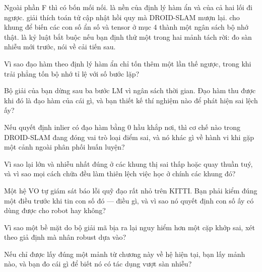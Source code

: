 \documentclass[../../deep_learning.tex]{subfiles}
\begin{document}
Ngoài phần F thì có bốn mối nối.  là nền của định lý hàm ẩn và của cả hai lối đi ngược.  giải thích toán tử cập nhật hồi quy mà DROID-SLAM mượn lại.  cho khung để biến các con số ẩn số và tensor ở mục 4 thành một ngân sách bộ nhớ thật.  là kỷ luật bắt buộc nếu bạn định thử một trong hai mảnh tách rời: đo sàn nhiễu mới trước, nói về cải tiến sau.

\begin{tukiem}
\item Vì sao đạo hàm theo định lý hàm ẩn chỉ tốn thêm một lần thế ngược, trong khi trải phẳng tốn bộ nhớ tỉ lệ với số bước lặp?
\item Bộ giải của bạn dừng sau ba bước LM vì ngân sách thời gian. Đạo hàm thu được khi đó là đạo hàm của cái gì, và bạn thiết kế thí nghiệm nào để phát hiện sai lệch ấy?
\item Nếu quyết định inlier có đạo hàm bằng 0 hầu khắp nơi, thì cơ chế nào trong DROID-SLAM đang đóng vai trò loại điểm sai, và nó khác gì về hành vi khi gặp một cảnh ngoài phân phối huấn luyện?
\item Vì sao  lại lớn và nhiễu nhất đúng ở các khung thị sai thấp hoặc quay thuần tuý, và vì sao mọi cách chữa đều làm thiên lệch việc học ở chính các khung đó?
\item Một hệ VO tự giám sát báo lỗi quỹ đạo rất nhỏ trên KITTI. Bạn phải kiểm đúng một điều trước khi tin con số đó --- điều gì, và vì sao nó quyết định con số ấy có dùng được cho robot hay không?
\item Vì sao một bề mặt do bộ giải mã bịa ra lại nguy hiểm hơn một cặp khớp sai, xét theo giả định mà nhân robust dựa vào?
\item Nếu chỉ được lấy đúng một mảnh từ chương này về hệ hiện tại, bạn lấy mảnh nào, và bạn đo cái gì để biết nó có tác dụng vượt sàn nhiễu?
\end{tukiem}
\ifSubfilesClassLoaded{\printbibliography[title={Nguồn}]}{}
\end{document}
